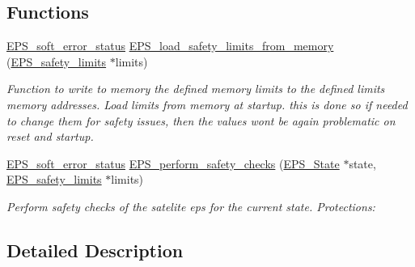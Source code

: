 \subsection*{Functions}
\begin{DoxyCompactItemize}
\item 
\hyperlink{group__softerror_ga82875cd4cc1b94ab7e638961c1b79e08}{E\-P\-S\-\_\-soft\-\_\-error\-\_\-status} \hyperlink{group__eps__safety_ga39c4acaac6d5e9818c1570ca02c2e015}{E\-P\-S\-\_\-load\-\_\-safety\-\_\-limits\-\_\-from\-\_\-memory} (\hyperlink{struct_e_p_s__safety__limits}{E\-P\-S\-\_\-safety\-\_\-limits} $\ast$limits)
\begin{DoxyCompactList}\small\item\em Function to write to memory the defined memory limits to the defined limits memory addresses. Load limits from memory at startup. this is done so if needed to change them for safety issues, then the values wont be again problematic on reset and startup. \end{DoxyCompactList}\item 
\hyperlink{group__softerror_ga82875cd4cc1b94ab7e638961c1b79e08}{E\-P\-S\-\_\-soft\-\_\-error\-\_\-status} \hyperlink{group__eps__safety_ga2867775c8dee462ce7a20867e8582df0}{E\-P\-S\-\_\-perform\-\_\-safety\-\_\-checks} (\hyperlink{struct_e_p_s___state}{E\-P\-S\-\_\-\-State} $\ast$state, \hyperlink{struct_e_p_s__safety__limits}{E\-P\-S\-\_\-safety\-\_\-limits} $\ast$limits)
\begin{DoxyCompactList}\small\item\em Perform safety checks of the satelite eps for the current state. Protections\-: \end{DoxyCompactList}\end{DoxyCompactItemize}


\subsection{Detailed Description}


